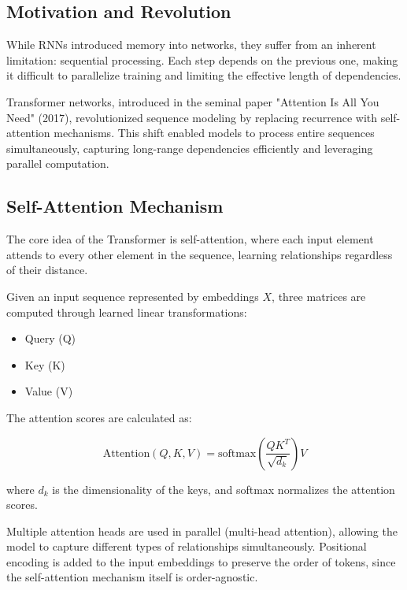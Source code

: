 \documentclass{book}
\begin{document}
\subsection{Motivation and Revolution}

While RNNs introduced memory into networks, they suffer from an inherent 
limitation: sequential processing. Each step depends on the previous one, making
it difficult to parallelize training and limiting the effective length of 
dependencies.

Transformer networks, introduced in the seminal paper 
"Attention Is All You Need" (2017), revolutionized sequence modeling by 
replacing recurrence with self-attention mechanisms. This shift enabled models 
to process entire sequences simultaneously, capturing long-range dependencies 
efficiently and leveraging parallel computation.

\subsection{Self-Attention Mechanism}

The core idea of the Transformer is self-attention, where each input element 
attends to every other element in the sequence, learning relationships 
regardless of their distance.

Given an input sequence represented by embeddings $X$, three matrices are 
computed through learned linear transformations:

\begin{itemize}
    \item Query (Q)
    \item Key (K)
    \item Value (V)
\end{itemize}

The attention scores are calculated as:

\begin{equation}
\text{Attention}(Q, K, V) = \text{softmax}\left(\frac{QK^T}{\sqrt{d_k}}\right)V
\end{equation}

where $d_k$ is the dimensionality of the keys, and softmax normalizes the 
attention scores.

Multiple attention heads are used in parallel (multi-head attention), 
allowing the model to capture different types of relationships simultaneously. 
Positional encoding is added to the input embeddings to preserve the order of 
tokens, since the self-attention mechanism itself is order-agnostic.
\end{document}
